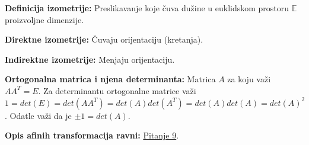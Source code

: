 \documentclass[12pt]{article}
\begin{document}
\textbf{Definicija izometrije:} Preslikavanje koje čuva dužine u euklidskom prostoru
$\mathbb{E}$ proizvoljne dimenzije.
\par

\textbf{Direktne izometrije:} Čuvaju orijentaciju (kretanja).
\par

\textbf{Indirektne izometrije:} Menjaju orijentaciju.
\par

\textbf{Ortogonalna matrica i njena determinanta:} Matrica $A$ za koju važi
$AA^T=E$. Za determinantu ortogonalne matrice važi
$1=det(E)=det(AA^T)=det(A)det(A^T)=det(A)det(A)=det(A)^2$. Odatle važi da je
$\pm 1=det(A)$.
\par

\textbf{Opis afinih transformacija ravni:} \hyperref[subsec:pitanje_9]{Pitanje 9}.
\par
\end{document}

